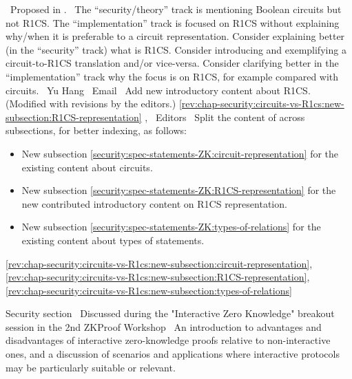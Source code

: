 \newcol \ccontext\ Proposed in .
				\propContrib\ The ``security/theory'' track is mentioning Boolean circuits but not R1CS. The ``implementation'' track is focused on R1CS without explaining why/when it is preferable to a circuit representation. Consider explaining better (in the ``security'' track) what is R1CS. Consider introducing and exemplifying a circuit-to-R1CS translation and/or vice-versa. Consider clarifying better in the ``implementation'' track why the focus is on R1CS, for example compared with circuits.
\newcol {}
\newcol \contributors\ Yu Hang
				\submit\ Email
				\Chan\ Add new introductory content about R1CS. (Modified with revisions by the editors.)
\newcol \ref{rev:chap-security:circuits-vs-R1cs:new-subsection:R1CS-representation}
\rowendL
\newcol 
\newcol {}, 
\newcol \contributors\ Editors
				\Chan\ Split the content of  across subsections, for better indexing, as follows:
				\begin{itemize}
				\item New subsection \ref{security:spec-statements-ZK:circuit-representation} for the existing content about circuits. 
				\item New subsection \ref{security:spec-statements-ZK:R1CS-representation} for the new contributed introductory content on R1CS representation.
				\item New subsection \ref{security:spec-statements-ZK:types-of-relations} for the existing content about types of statements.
				\end{itemize}
\newcol \ref{rev:chap-security:circuits-vs-R1cs:new-subsection:circuit-representation}, \ref{rev:chap-security:circuits-vs-R1cs:new-subsection:R1CS-representation}, \ref{rev:chap-security:circuits-vs-R1cs:new-subsection:types-of-relations}
\rowendL
\myendIssue



Security section
\newcol \ccontext\ Discussed during the "Interactive Zero Knowledge" breakout session in the 2nd ZKProof Workshop
				\propContrib\ An introduction to advantages and disadvantages of interactive zero-knowledge proofs relative to non-interactive ones, and a discussion of scenarios and applications where interactive protocols may be particularly suitable or relevant.
				
